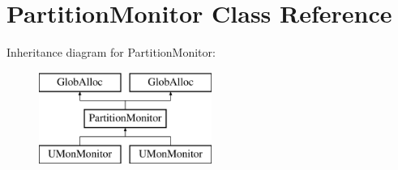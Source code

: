 \hypertarget{classPartitionMonitor}{\section{Partition\-Monitor Class Reference}
\label{classPartitionMonitor}
}
Inheritance diagram for Partition\-Monitor\-:\begin{figure}[H]
\begin{center}
\leavevmode
\includegraphics[height=3.000000cm]{classPartitionMonitor}
\end{center}
\end{figure}
